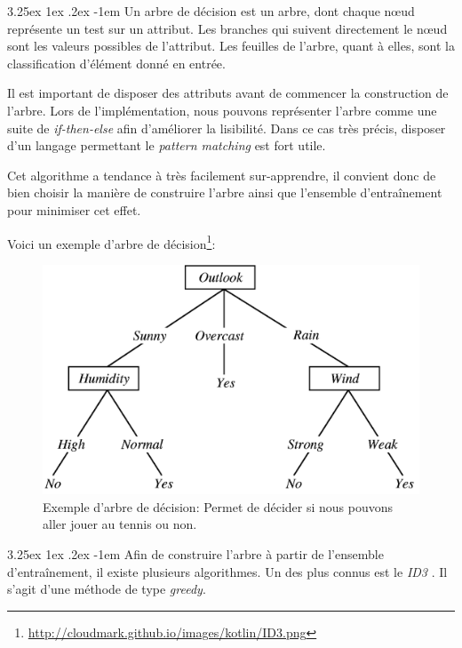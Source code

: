 \documentclass[a4paper, 11pt]{article}
\makeatletter
\renewcommand\paragraph{\@startsection{paragraph}{5}{\z@}%
  {3.25ex \@plus1ex \@minus.2ex}%
  {-1em}%
  {\normalfont\normalsize\bfseries}}
\makeatother
\begin{document}
\paragraph{}
Un arbre de décision est un arbre, dont chaque nœud représente un test sur un attribut. 
Les branches qui suivent directement le nœud sont les valeurs possibles de l'attribut. 
Les feuilles de l'arbre, quant à elles, sont la classification d'élément donné en entrée.

Il est important de disposer des attributs avant de commencer la construction de l'arbre. 
Lors de l'implémentation, nous pouvons représenter l'arbre comme une suite de \textit{if-then-else} afin 
d'améliorer la lisibilité. Dans ce cas très précis, disposer d'un langage permettant le \textit{pattern matching} est fort utile.

Cet algorithme a tendance à très facilement sur-apprendre, il convient donc de bien choisir la manière de construire 
l'arbre ainsi que l'ensemble d'entraînement pour minimiser cet effet. 

Voici un exemple d'arbre de décision\footnote{\url{http://cloudmark.github.io/images/kotlin/ID3.png}}:
\begin{figure}[h!]
\centering
\includegraphics{images/exemple_tree}
\caption{Exemple d'arbre de décision: Permet de décider si nous pouvons aller jouer au tennis ou non.}
\end{figure}

\paragraph{}
Afin de construire l'arbre à partir de l'ensemble d'entraînement, il existe plusieurs algorithmes. 
Un des plus connus est le \textit{ID3} \cite{id3}. Il s'agit d'une méthode de type \textit{greedy}.
\end{document}
